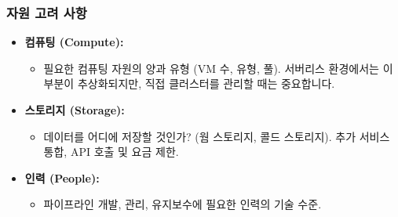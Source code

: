 \documentclass[11pt,a4paper]{article}
\begin{document}
\subsubsection{자원 고려 사항}
\begin{itemize}
    \item \textbf{컴퓨팅 (Compute):}
    \begin{itemize}
        \item 필요한 컴퓨팅 자원의 양과 유형 (VM 수, 유형, 풀). 서버리스 환경에서는 이 부분이 추상화되지만, 직접 클러스터를 관리할 때는 중요합니다.
    \end{itemize}
    \item \textbf{스토리지 (Storage):}
    \begin{itemize}
        \item 데이터를 어디에 저장할 것인가? (웜 스토리지, 콜드 스토리지). 추가 서비스 통합, API 호출 및 요금 제한.
    \end{itemize}
    \item \textbf{인력 (People):}
    \begin{itemize}
        \item 파이프라인 개발, 관리, 유지보수에 필요한 인력의 기술 수준.
    \end{itemize}
\end{itemize}
\end{document}
